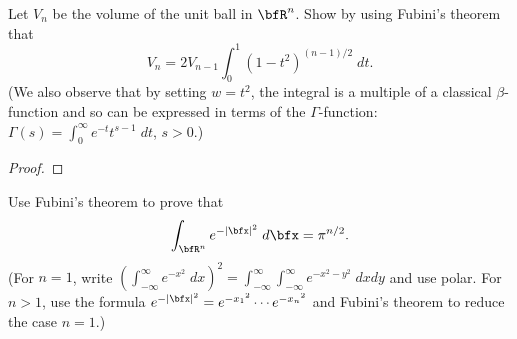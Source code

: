 \begin{problem}
 Let $V_n$ be the volume of the unit ball in $\bfR^n$. Show by using
 Fubini's theorem that
\[
V_n=2V_{n-1}\int_0^1\left(1-t^2\right)^{(n-1)/2}\;dt.
\]
(We also observe that by setting $w=t^2$, the integral is a multiple of a
classical $\beta$-function and so can be expressed in terms of the
$\Gamma$-function: $\Gamma(s)=\int_0^\infty e^{-t}t^{s-1}\;dt$, $s>0$.)
\end{problem}
\begin{proof}

\end{proof}
\newpage

\begin{problem}
Use Fubini's theorem to prove that
\[
\int_{\bfR^n}e^{-|\bfx|^2}\;d\bfx=\pi^{n/2}.
\]
(For $n=1$, write $\left(\int_{-\infty}^\infty
e^{-x^2}\;dx\right)^2=\int_{-\infty}^\infty\int_{-\infty}^\infty e^{-x^2-y^2}\;dxdy$
and use polar. For $n>1$, use the formula $e^{-|\bfx|^2}=e^{-{x_1}^2}\cdots
e^{-{x_n}^2}$ and Fubini's theorem to reduce the case $n=1$.)
\end{problem}
